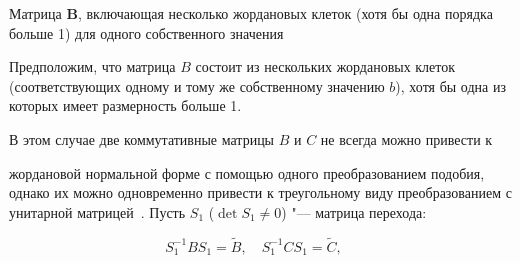 \smallskip



\Section

{Матрица $\boldsymbol B$, включающая несколько жордановых клеток (хотя бы одна порядка больше 1) для одного собственного значения}

Предположим, что матрица $B$ состоит из нескольких жордановых клеток (соответствующих одному и тому же собственному значению $b$), хотя бы одна из которых имеет размерность больше 1.

В этом случае две коммутативные матрицы $B$ и $C$ не всегда можно привести к

жордановой нормальной форме с помощью одного преобразованием подобия, однако  их можно одновременно привести к треугольному виду преобразованием с унитарной матрицей~\cite{kozlova:bib:Markus}. Пусть $S_1$ ($\det S_1\neq 0$) "--- матрица перехода:

\begin{equation*}

S_1^{-1}BS_1=\widetilde{B},\quad S_1^{-1}CS_1=\widetilde{C},\quad

\end{equation*}

